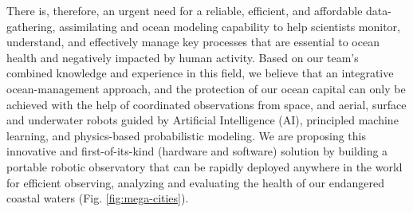 There is, therefore, an urgent need for a reliable, efficient, and
affordable data-gathering, assimilating and ocean modeling capability
to help scientists monitor, understand, and effectively manage key
processes that are essential to ocean health and negatively impacted
by human activity. Based on our team's combined knowledge and
experience in this field, we believe that an integrative
ocean-management approach, and the protection of our ocean capital can
only be achieved with the help of coordinated observations from space,
and aerial, surface and underwater robots guided by Artificial
Intelligence (AI), principled machine learning, and physics-based probabilistic modeling. We are proposing this innovative and
first-of-its-kind (hardware and software) solution by building a
portable robotic observatory that can be rapidly deployed anywhere in
the world for efficient observing, analyzing and evaluating the health of our
endangered coastal waters (Fig. \ref{fig:mega-cities}).



